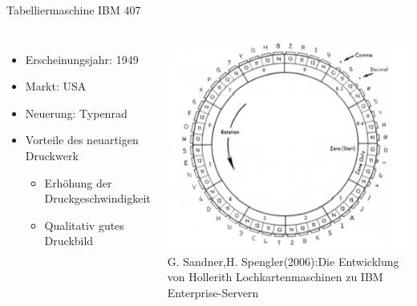 \documentclass[EU2]{beamer}
\begin{document}
\begin{frame}{Tabelliermaschine IBM 407}
   \begin{columns}
    \begin{itemize}
      \item Erscheinungsjahr: 1949
      \item Markt: USA
      \item Neuerung: Typenrad
      \item Vorteile des neuartigen Druckwerk
      	\begin{itemize}
          \item Erhöhung der Druckgeschwindigkeit
          \item Qualitativ gutes Druckbild
       \end{itemize}
    \end{itemize}
      \includegraphics[height=0.4\textheight]{typenrad}\\
      \tiny{G. Sandner,H. Spengler(2006):Die Entwicklung von Hollerith Lochkartenmaschinen zu IBM Enterprise-Servern}
  \end{columns}
\end{frame}
\end{document}
